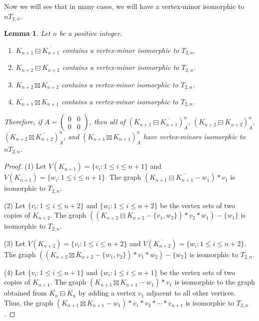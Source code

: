 \documentclass[11pt]{article}
\newtheorem{lemma}[theorem]{Lemma}
\newcommand\mat{\boxminus}
\newcommand\antimat{\boxtimes}
\def\K_#1{{K_{#1}}}
\def\S_#1{\overline{K_{#1}}}
\begin{document}
Now we will see that in many cases, we will have a vertex-minor
isomorphic to  $nT_{2,n}$.
\begin{lemma}\label{lem:obtainnt2}
  Let $n$ be a positive integer.
  \begin{enumerate}[(1)]
  \item $\K_{n+1}\mat\S_{n+1}$ contains a vertex-minor isomorphic to $T_{2,n}$.
  \item $\K_{n+2}\mat\K_{n+2}$ contains a vertex-minor isomorphic to $T_{2,n}$.
  \item $\K_{n+2}\antimat\S_{n+2}$ contains a vertex-minor isomorphic to $T_{2,n}$.
  \item $\K_{n+1}\antimat\K_{n+1}$ contains a vertex-minor isomorphic to $T_{2,n}$.
  \end{enumerate}
  Therefore, if $A=(
  \begin{smallmatrix}
    0 & 0\\
    0 & 0
  \end{smallmatrix})$, then 
  all of $(\K_{n+1}\mat \S_{n+1})^n_A$,
  $(\K_{n+2}\mat \K_{n+2})^n_A$,
  $(\K_{n+2}\antimat \S_{n+2})^n_A$,
  and 
  $(\K_{n+1}\antimat \K_{n+1})^n_A$
  have vertex-minors isomorphic to $nT_{2,n}$.
  
\end{lemma}
\begin{proof}
 (1) Let $V(\K_{n+1})=\{v_i:1\le i\le n+1\}$ and $V(\S_{n+1})=\{w_i:1\le i\le n+1\}$.
	The graph $(\K_{n+1}\mat\S_{n+1}-w_1)*v_1$ is isomorphic to $T_{2,n}$.
     
    (2) Let $\{v_i:1\le i\le n+2\}$ and $\{w_i:1\le i\le n+2\}$ be the vertex sets of two copies of $\K_{n+2}$. 
    The graph $((\K_{n+2}\mat\K_{n+2}-\{v_1, w_2\})*v_2*w_1)-\{w_1\}$ is isomorphic to $T_{2,n}$.

  (3) Let $V(\K_{n+2})=\{v_i:1\le i\le n+2\}$ and $V(\S_{n+2})=\{w_i:1\le i\le n+2\}$.
	The graph $((\K_{n+2}\antimat\S_{n+2}-\{w_1, v_2\})*v_1*w_2)-\{w_2\}$ is isomorphic to $T_{2,n}$.

 (4) Let $\{v_i:1\le i\le n+1\}$ and $\{w_i:1\le i\le n+1\}$ be the vertex sets of two copies of $\K_{n+1}$. 
  The graph $(\K_{n+1}\antimat\K_{n+1}-w_1)*v_1$ is isomorphic to the graph obtained from $\S_{n}\mat \S_{n}$ by adding a vertex $v_1$ adjacent to all other vertices.
    Thus, the graph $(\K_{n+1}\antimat\K_{n+1}-w_1)*v_1*v_2*\cdots *v_{n+1}$ is isomorphic to $T_{2,n}$.
  \end{proof}
\end{document}
